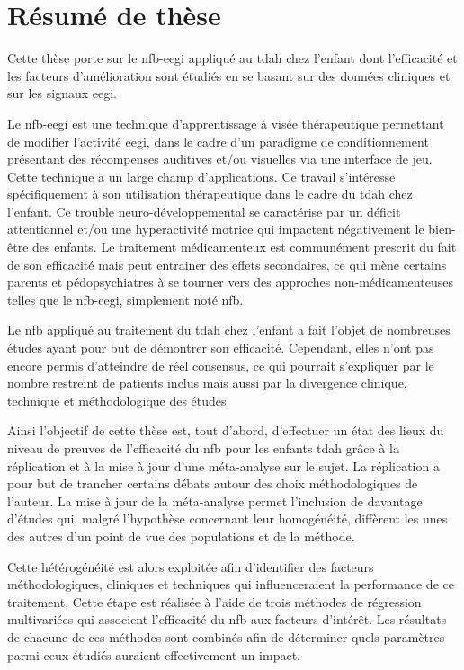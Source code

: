 
\chapter*{Résumé de thèse}

\large{
Cette thèse porte sur le \gls{nfb}-\gls{eegi} appliqué au \gls{tdah} chez l'enfant dont l'efficacité et les 
facteurs d'amélioration sont étudiés en se basant sur des données cliniques et sur les signaux \gls{eegi}. 

Le \gls{nfb}-\gls{eegi} est une technique d'apprentissage à visée thérapeutique permettant de modifier l'activité \gls{eegi}, 
dans le cadre d'un paradigme de conditionnement présentant des récompenses auditives et/ou visuelles via une 
interface de jeu. Cette technique a un large champ d'applications. Ce travail s'intéresse spécifiquement à son utilisation
thérapeutique dans le cadre 
du \gls{tdah} chez l'enfant. Ce trouble neuro-développemental se caractérise par un déficit attentionnel et/ou une hyperactivité 
motrice qui impactent négativement le bien-être des enfants. Le traitement médicamenteux est communément prescrit du fait 
de son efficacité mais peut entrainer des effets secondaires, ce qui mène certains parents et pédopsychiatres à se tourner 
vers des approches non-médicamenteuses telles que le \gls{nfb}-\gls{eegi}, simplement noté \gls{nfb}.
 
Le \gls{nfb} appliqué au traitement du \gls{tdah} chez l'enfant a fait l'objet de nombreuses études ayant pour but de démontrer son efficacité. 
Cependant, elles n'ont pas encore permis d'atteindre de réel consensus, ce qui pourrait s'expliquer par le nombre restreint de patients inclus 
mais aussi par la divergence clinique, technique et méthodologique des études. 

Ainsi l'objectif de cette thèse est, tout d'abord, d'effectuer un état des lieux du niveau de preuves de l'efficacité 
du \gls{nfb} pour les enfants \gls{tdah} grâce à la réplication et à la mise à jour d'une méta-analyse sur le sujet. 
La réplication a pour but de trancher certains débats autour des choix méthodologiques de l'auteur. 
La mise à jour de la méta-analyse permet l'inclusion de davantage d'études qui, malgré l'hypothèse concernant leur homogénéité,
diffèrent les unes des autres d'un point de vue des populations et de la méthode.  

Cette hétérogénéité est alors exploitée afin d'identifier des facteurs méthodologiques, cliniques et techniques qui influenceraient 
la performance de ce traitement. Cette étape 
est réalisée à l'aide de trois méthodes de régression multivariées qui associent l'efficacité du \gls{nfb} aux facteurs d'intérêt. 
Les résultats de chacune de ces méthodes sont combinés afin de déterminer quels paramètres parmi ceux étudiés auraient effectivement un impact. 

}
